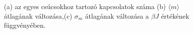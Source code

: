 \documentclass[12pt]{article}
\begin{document}
\begin{figure}[H]
\centering     
{}

\caption{(a) az egyes csúcsokhoz tartozó kapcsolatok száma (b) $\langle m\rangle$ átlagának változása,(c) $\sigma_m$ átlagának változása a $\beta J$ értékének függvényében.}
\label{fig: k}
\end{figure}
\end{document}
